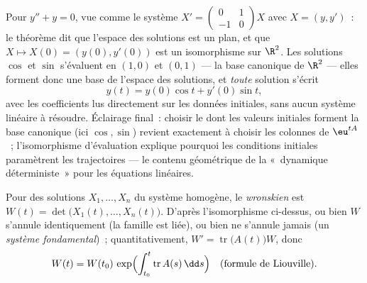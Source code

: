 \begin{example}\label{ex:b2:diffeq:evaliso}
Pour $y'' + y = 0$, vue comme le système $X' =
\begin{pmatrix} 0 & 1\\ -1 & 0\end{pmatrix}X$ avec $X = (y,
y')$~: le théorème dit que l'espace des solutions est un plan, et
que $X \mapsto X(0) = (y(0), y'(0))$ est un isomorphisme sur
$\R^2$. Les solutions $\cos$ et $\sin$ s'évaluent en $(1, 0)$
et $(0, 1)$ --- la base canonique de $\R^2$ --- elles forment
donc une base de l'espace des solutions, et \emph{toute} solution
s'écrit
\[
y(t) = y(0)\cos t + y'(0)\sin t ,
\]
avec les coefficients lus directement sur les données initiales,
sans aucun système linéaire à résoudre. Éclairage final~: choisir
le  dont les valeurs initiales forment la base
canonique (ici $\cos, \sin$) revient exactement à choisir les
colonnes de $\eu^{tA}$~; l'isomorphisme d'évaluation explique
pourquoi les conditions initiales paramètrent les trajectoires ---
le contenu géométrique de la «~dynamique déterministe~» pour les
équations linéaires.
\end{example}

\begin{definition}[Wronskien]\label{def:b2:diffeq:wronskian}
Pour des solutions $X_1, \dots, X_n$ du système homogène, le
\emph{wronskien} est $W(t) = \det\bigl(X_1(t),
\dots, X_n(t)\bigr)$. D'après l'isomorphisme ci-dessus, ou bien $W$
s'annule identiquement (la famille est liée), ou bien ne s'annule
jamais (un \emph{système fondamental})~;
quantitativement, $W' = \operatorname{tr}\bigl(A(t)\bigr)
W$, donc
\[
W(t) = W(t_0)\,\exp\Bigl(\int_{t_0}^{t}
\operatorname{tr} A(s)\,\dd s\Bigr)
\quad \text{(formule de Liouville)}.
\]
\end{definition}

